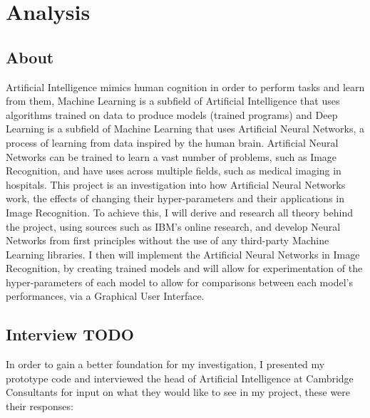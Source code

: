 \documentclass[./project-report/src/latex/project-report.tex]{subfiles}
\begin{document}
\maketitle

\section{Analysis}

\subsection{About}

Artificial Intelligence mimics human cognition in order to perform tasks and learn from them, Machine Learning is a subfield of Artificial Intelligence that uses 
algorithms trained on data to produce models (trained programs) and Deep Learning is a subfield of Machine Learning that uses Artificial Neural Networks, a process of 
learning from data inspired by the human brain. Artificial Neural Networks can be trained to learn a vast number of problems, such as Image Recognition, and have uses 
across multiple fields, such as medical imaging in hospitals. This project is an investigation into how Artificial Neural Networks work, the effects of changing their 
hyper-parameters and their applications in Image Recognition. To achieve this, I will derive and research all theory behind the project, using sources such as IBM's online 
research, and develop Neural Networks from first principles without the use of any third-party Machine Learning libraries. I then will implement the Artificial Neural 
Networks in Image Recognition, by creating trained models and will allow for experimentation of the hyper-parameters of each model to allow for comparisons between each 
model's performances, via a Graphical User Interface.

\subsection{Interview TODO}

In order to gain a better foundation for my investigation, I presented my prototype code and interviewed the head of Artificial Intelligence at Cambridge Consultants 
for input on what they would like to see in my project, these were their responses:

\end{document}
